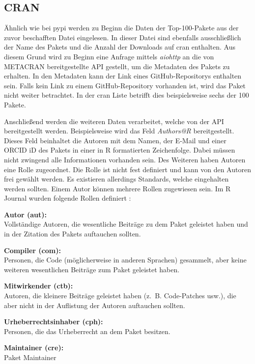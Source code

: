 \newpage
\subsection{CRAN}
\label{subsec:datenbeschaffung_cran}
Ähnlich wie bei \gls{pypi} werden zu Beginn die Daten der Top-100-Pakete aus der zuvor beschafften Datei eingelesen.
In dieser Datei sind ebenfalls ausschließlich der Name des Pakets und die Anzahl der Downloads auf \gls{cran} enthalten.
Aus diesem Grund wird zu Beginn eine Anfrage mittels \emph{aiohttp} an die von METACRAN bereitgestellte API gestellt, um die Metadaten des Pakets zu erhalten.
In den Metadaten kann der Link eines GitHub-Repositorys enthalten sein.
Falls kein Link zu einem GitHub-Repository vorhanden ist, wird das Paket nicht weiter betrachtet.
In der \gls{cran} Liste betrifft dies beispielsweise sechs der 100 Pakete.

Anschließend werden die weiteren Daten verarbeitet, welche von der API bereitgestellt werden.
Beispielsweise wird das Feld \emph{Authors@R} bereitgestellt.
Dieses Feld beinhaltet die Autoren mit dem Namen, der E-Mail und einer ORCID iD des Pakets in einer in R formatierten Zeichenfolge.
Dabei müssen nicht zwingend alle Informationen vorhanden sein.
Des Weiteren haben Autoren eine Rolle zugeordnet.
Die Rolle ist nicht fest definiert und kann von den Autoren frei gewählt werden.
Es existieren allerdings Standards, welche eingehalten werden sollten.
Einem Autor können mehrere Rollen zugewiesen sein.
Im R Journal wurden folgende Rollen definiert \autocite{hornik_who_2011}:

\textbf{Autor (aut):}\\
Vollständige Autoren, die wesentliche Beiträge zu dem Paket geleistet haben und in der Zitation des Pakets auftauchen sollten.

\textbf{Compiler (com):}\\
Personen, die Code (möglicherweise in anderen Sprachen) gesammelt, aber keine weiteren wesentlichen Beiträge zum Paket geleistet haben.

\textbf{Mitwirkender (ctb):}\\
Autoren, die kleinere Beiträge geleistet haben (z.~B. Code-Patches usw.), die aber nicht in der Auflistung der Autoren auftauchen sollten.

\textbf{Urheberrechtsinhaber (cph):}\\
Personen, die das Urheberrecht an dem Paket besitzen.

\textbf{Maintainer (cre):}\\
Paket Maintainer


